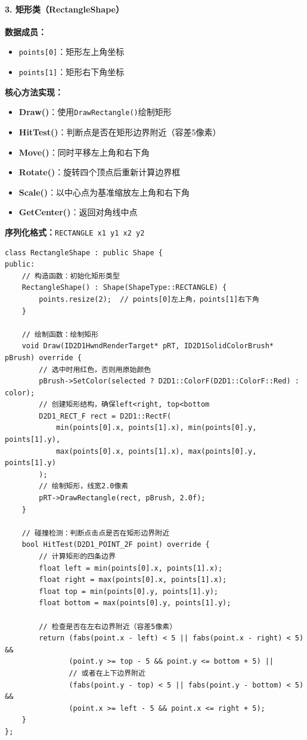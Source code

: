 \documentclass[12pt,a4paper]{article}
\begin{document}
\paragraph{3. 矩形类（RectangleShape）}

\begin{tcolorbox}
\textbf{数据成员：}
\begin{itemize}
    \item \texttt{points[0]}：矩形左上角坐标
    \item \texttt{points[1]}：矩形右下角坐标
\end{itemize}

\textbf{核心方法实现：}
\begin{itemize}
    \item \textbf{Draw()}：使用\texttt{DrawRectangle()}绘制矩形
    \item \textbf{HitTest()}：判断点是否在矩形边界附近（容差5像素）
    \item \textbf{Move()}：同时平移左上角和右下角
    \item \textbf{Rotate()}：旋转四个顶点后重新计算边界框
    \item \textbf{Scale()}：以中心点为基准缩放左上角和右下角
    \item \textbf{GetCenter()}：返回对角线中点
\end{itemize}

\textbf{序列化格式：}\texttt{RECTANGLE x1 y1 x2 y2}
\end{tcolorbox}

\begin{lstlisting}[caption=RectangleShape类定义]
class RectangleShape : public Shape {
public:
    // 构造函数：初始化矩形类型
    RectangleShape() : Shape(ShapeType::RECTANGLE) {
        points.resize(2);  // points[0]左上角，points[1]右下角
    }
    
    // 绘制函数：绘制矩形
    void Draw(ID2D1HwndRenderTarget* pRT, ID2D1SolidColorBrush* pBrush) override {
        // 选中时用红色，否则用原始颜色
        pBrush->SetColor(selected ? D2D1::ColorF(D2D1::ColorF::Red) : color);
        // 创建矩形结构，确保left<right, top<bottom
        D2D1_RECT_F rect = D2D1::RectF(
            min(points[0].x, points[1].x), min(points[0].y, points[1].y),
            max(points[0].x, points[1].x), max(points[0].y, points[1].y)
        );
        // 绘制矩形，线宽2.0像素
        pRT->DrawRectangle(rect, pBrush, 2.0f);
    }
    
    // 碰撞检测：判断点击点是否在矩形边界附近
    bool HitTest(D2D1_POINT_2F point) override {
        // 计算矩形的四条边界
        float left = min(points[0].x, points[1].x);
        float right = max(points[0].x, points[1].x);
        float top = min(points[0].y, points[1].y);
        float bottom = max(points[0].y, points[1].y);
        
        // 检查是否在左右边界附近（容差5像素）
        return (fabs(point.x - left) < 5 || fabs(point.x - right) < 5) &&
               (point.y >= top - 5 && point.y <= bottom + 5) ||
               // 或者在上下边界附近
               (fabs(point.y - top) < 5 || fabs(point.y - bottom) < 5) &&
               (point.x >= left - 5 && point.x <= right + 5);
    }
};
\end{lstlisting}
\end{document}
